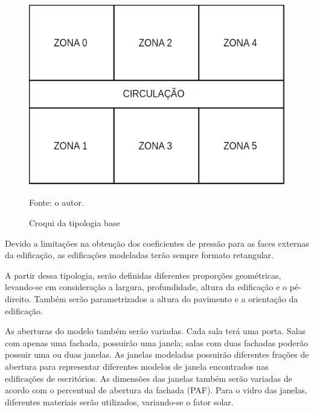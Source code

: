 \documentclass[brazil,hardcopy,openany,a5paper]{ufscthesis}
\begin{document}
		\begin{figure}[h]
			\centering
			\caption{Croqui da tipologia base}
			\includegraphics[width=1\linewidth]{img/croqui.png}
			\label{fig:croqui}
			\begin{flushleft}
				Fonte: o autor.
			\end{flushleft}
		\end{figure}
		
		Devido a limitações na obtenção dos coeficientes de pressão para as faces externas da edificação, as edificações modeladas terão sempre formato retangular.
		
		A partir dessa tipologia, serão definidas diferentes proporções geométricas, levando-se em consideração a largura, profundidade, altura da edificação e o pé-direito. Também serão parametrizados a altura do pavimento e a orientação da edificação.
		
		As aberturas do modelo também serão variadas. Cada sala terá uma porta. Salas com apenas uma fachada, possuirão uma janela; salas com duas fachadas poderão possuir uma ou duas janelas. As janelas modeladas possuirão diferentes frações de abertura para representar diferentes modelos de janela encontrados nas edificações de escritórios. As dimensões das janelas também serão variadas de acordo com o percentual de abertura da fachada (PAF).
		Para o vidro das janelas, diferentes materiais serão utilizados, variando-se o fator solar.
		
\end{document}
